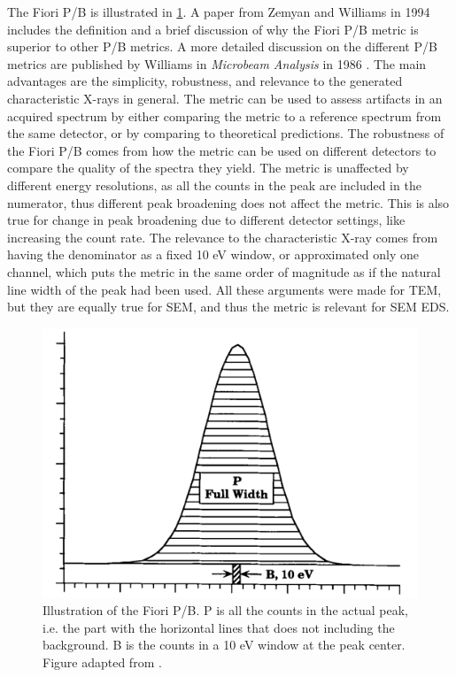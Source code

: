 

The Fiori P/B is illustrated in \cref{fig:fiori_pb}.
A paper from Zemyan and Williams in 1994 \cite{zemyan_standard_performance_1994} includes the definition and a brief discussion of why the Fiori P/B metric is superior to other P/B metrics.
A more detailed discussion on the different P/B metrics are published by Williams in \emph{Microbeam Analysis} in 1986 \cite{williams_standard_definitions_1986}.
The main advantages are the simplicity, robustness, and relevance to the generated characteristic X-rays in general.
The metric can be used to assess artifacts in an acquired spectrum by either comparing the metric to a reference spectrum from the same detector, or by comparing to theoretical predictions.
The robustness of the Fiori P/B comes from how the metric can be used on different detectors to compare the quality of the spectra they yield.
The metric is unaffected by different energy resolutions, as all the counts in the peak are included in the numerator, thus different peak broadening does not affect the metric.
This is also true for change in peak broadening due to different detector settings, like increasing the count rate.
The relevance to the characteristic X-ray comes from having the denominator as a fixed 10 eV window, or approximated only one channel, which puts the metric in the same order of magnitude as if the natural line width of the peak had been used.
All these arguments were made for TEM, but they are equally true for SEM, and thus the metric is relevant for SEM EDS.




\begin{figure}[htbp]
    \centering
    \includegraphics[width=0.6\linewidth]{figures/FioriPB_TODO_remake.png}
    \caption{
        Illustration of the Fiori P/B.
        P is all the counts in the actual peak, i.e. the part with the horizontal lines that does not including the background.
        B is the counts in a 10 eV window at the peak center.
        Figure adapted from \cite{zemyan_standard_performance_1994}.
        }
    \label{fig:fiori_pb}
\end{figure}


